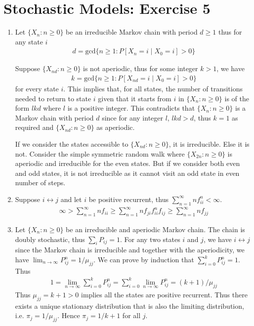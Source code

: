 \documentclass[a4paper,10pt]{article}
\theoremstyle{definition}
\begin{document}
\section*{Stochastic Models: Exercise 5}

\begin{enumerate}
\item Let $\{X_n: n\geq 0\}$ be an irreducible Markov chain with period $d \geq 1$ thus for any state $i$
\begin{align*}
d=\text{gcd}\{n\geq 1: P\left[X_n=i\mid X_0=i\right]>0\}
\end{align*}


Suppose $\{X_{nd}:n\geq 0\}$ is not aperiodic, thus for some integer $k>1$, we have
\begin{align*}  
k=\text{gcd}\{n\geq 1: P\left[X_{nd}=i\mid X_0=i\right]>0\}
\end{align*}
for every state $i$. This implies that, for all states, the number of transitions needed to return to state $i$ given that it starts from $i$ in $\{X_n: n\geq 0\}$ is of the form $lkd$ where $l$ is a positive integer. This contradicts that $\{X_n: n\geq 0\}$ is a Markov chain with period $d$ since for any integer $l$, $lkd>d$, thus $k=1$ as required and $\{X_{nd}: n\geq 0\}$ as aperiodic.

If we consider the states accessible to $\{X_{nd}: n\geq 0\}$, it is irreducible. Else it is not. Consider the simple symmetric random walk where $\{X_{2n}: n\geq 0\}$ is aperiodic and irreducible for the even states. But if we consider both even and odd states, it is not irreducible as it cannot visit an odd state in even number of steps.

\item Suppose $i \leftrightarrow j$ and let $i$ be positive recurrent, thus $\sum_{n=1}^{\infty}nf_{ii}^n<\infty$. 
\begin{align*}
\infty >\sum_{n=1}^{\infty}nf_{ii}\geq \sum_{n=1}^{\infty}nf_{ji}f_{ii}^nf_{ij}\geq \sum_{n=1}^{\infty}nf_{jj}
\end{align*}


\item Let $\{X_n:n\geq 0\}$ be an irreducible and aperiodic Markov chain. The chain is doubly stochastic, thus $\sum_{i}P_{ij}=1$. For any two states $i$ and $j$, we have $i \leftrightarrow j$ since the Markov chain is irreducible and together with the aperiodicity, we have $\lim_{n\to\infty}P_{ij}^n=1/\mu_{jj}$. We can prove by induction that $\sum^{k}_{i=0}P^n_{ij}=1$. Thus
\begin{align*}
1 = \lim_{n\to\infty}\sum_{i=0}^{k}P^n_{ij}=\sum_{i=0}^{k}\lim_{n\to\infty}P^n_{ij}=(k+1)/\mu_{jj}
\end{align*}
Thus $\mu_{jj}=k+1>0$ implies all the states are positive recurrent. Thus there exists a unique stationary distribution that is also the limiting distribution, i.e. $\pi_j = 1/\mu_{jj}$. Hence $\pi_j = 1/k+1$ for all $j$.


\end{enumerate}
\end{document}
